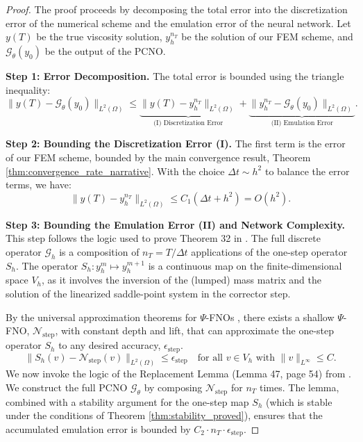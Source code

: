 \documentclass[pdflatex,sn-mathphys-num]{sn-jnl}%
\theoremstyle{thmstyleone}%
\numberwithin{equation}{section}
\begin{document}
\begin{proof}
The proof proceeds by decomposing the total error into the discretization error of the numerical scheme and the emulation error of the neural network. Let $y(T)$ be the true viscosity solution, $y_h^{n_T}$ be the solution of our FEM scheme, and $\mathcal{G}_\theta(y_0)$ be the output of the PCNO.

\textbf{Step 1: Error Decomposition.}
The total error is bounded using the triangle inequality:
$$ \| y(T) - \mathcal{G}_\theta(y_0) \|_{L^2(\Omega)} \le \underbrace{\| y(T) - y_h^{n_T} \|_{L^2(\Omega)}}_{\text{(I) Discretization Error}} + \underbrace{\| y_h^{n_T} - \mathcal{G}_\theta(y_0) \|_{L^2(\Omega)}}_{\text{(II) Emulation Error}}. $$

\textbf{Step 2: Bounding the Discretization Error (I).}
The first term is the error of our FEM scheme, bounded by the main convergence result, Theorem \ref{thm:convergence_rate_narrative}. With the choice $\Delta t \sim h^2$ to balance the error terms, we have:
$$ \| y(T) - y_h^{n_T} \|_{L^2(\Omega)} \le C_1(\Delta t + h^2) = O(h^2). $$

\textbf{Step 3: Bounding the Emulation Error (II) and Network Complexity.}
This step follows the logic used to prove Theorem 32 in \cite{kovachki2021universal}. The full discrete operator $\mathcal{G}_h$ is a composition of $n_T = T/\Delta t$ applications of the one-step operator $S_h$. The operator $S_h: y_h^m \mapsto y_h^{m+1}$ is a continuous map on the finite-dimensional space $V_h$, as it involves the inversion of the (lumped) mass matrix and the solution of the linearized saddle-point system in the corrector step.

By the universal approximation theorems for $\Psi$-FNOs \cite[Theorem 15]{kovachki2021universal}, there exists a shallow $\Psi$-FNO, $\mathcal{N}_{\text{step}}$, with constant depth and lift, that can approximate the one-step operator $S_h$ to any desired accuracy, $\epsilon_{\text{step}}$.
$$ \| S_h(v) - \mathcal{N}_{\text{step}}(v) \|_{L^2(\Omega)} \le \epsilon_{\text{step}} \quad \text{for all } v \in V_h \text{ with } \|v\|_{L^\infty} \le C. $$
We now invoke the logic of the Replacement Lemma (Lemma 47, page 54) from \cite{kovachki2021universal}. We construct the full PCNO $\mathcal{G}_\theta$ by composing $\mathcal{N}_{\text{step}}$ for $n_T$ times. The lemma, combined with a stability argument for the one-step map $S_h$ (which is stable under the conditions of Theorem \ref{thm:stability_proved}), ensures that the accumulated emulation error is bounded by $C_2 \cdot n_T \cdot \epsilon_{\text{step}}$.


\end{proof}
\end{document}
